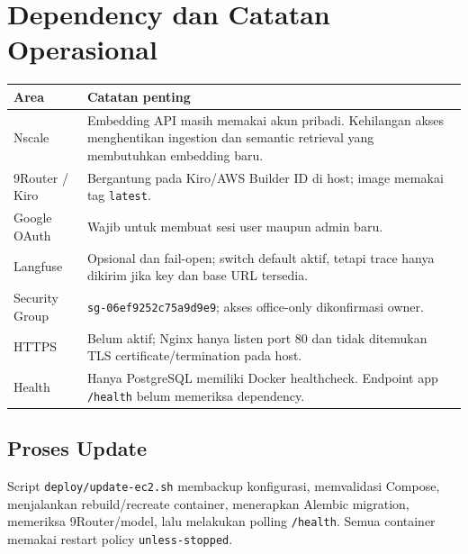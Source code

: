 \documentclass[11pt,a4paper]{article}
\begin{document}
\newpage
\section{Dependency dan Catatan Operasional}
\begin{tabularx}{\linewidth}{@{}p{3.5cm}X@{}}
\toprule \textbf{Area} & \textbf{Catatan penting} \\ \midrule
Nscale & Embedding API masih memakai akun pribadi. Kehilangan akses menghentikan ingestion dan semantic retrieval yang membutuhkan embedding baru. \\
9Router / Kiro & Bergantung pada Kiro/AWS Builder ID di host; image memakai tag \texttt{latest}. \\
Google OAuth & Wajib untuk membuat sesi user maupun admin baru. \\
Langfuse & Opsional dan fail-open; switch default aktif, tetapi trace hanya dikirim jika key dan base URL tersedia. \\
Security Group & \texttt{sg-06ef9252c75a9d9e9}; akses office-only dikonfirmasi owner. \\
HTTPS & Belum aktif; Nginx hanya listen port 80 dan tidak ditemukan TLS certificate/termination pada host. \\
Health & Hanya PostgreSQL memiliki Docker healthcheck. Endpoint app \texttt{/health} belum memeriksa dependency. \\
\bottomrule
\end{tabularx}

\subsection{Proses Update}
Script \texttt{deploy/update-ec2.sh} membackup konfigurasi, memvalidasi Compose, menjalankan rebuild/recreate container, menerapkan Alembic migration, memeriksa 9Router/model, lalu melakukan polling \texttt{/health}. Semua container memakai restart policy \texttt{unless-stopped}.



\newpage
\end{document}

